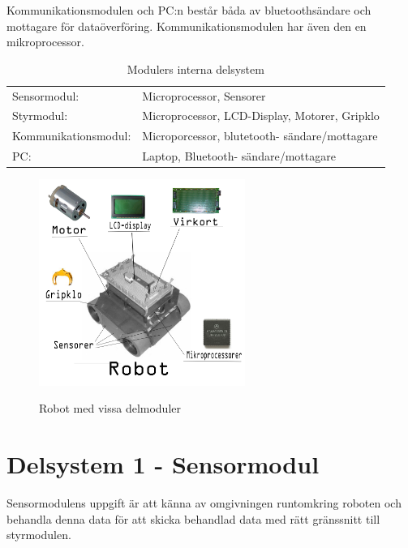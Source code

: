 \documentclass[11pt]{article}
\begin{document}
\begin{flushleft}
\bigskip

Kommunikationsmodulen och PC:n består båda av bluetoothsändare och mottagare för dataöverföring. Kommunikationsmodulen har även den en mikroprocessor.

\bigskip

\begin{table}[ht]

\centering
\begin{tabular}{l l}
Sensormodul:&
Microprocessor, Sensorer \\

Styrmodul:&
Microprocessor, LCD-Display, Motorer, Gripklo\\

Kommunikationsmodul:&
Microporcessor, blutetooth- sändare/mottagare  \\

PC:&
Laptop, Bluetooth- sändare/mottagare \\
\end{tabular}
\caption{Modulers interna delsystem}
\label{tab:Delmoduler}
\end{table}

\begin{figure}[H]
\centering
\caption{Robot med vissa delmoduler}
\includegraphics[width=0.6\textwidth]{Robot_moduler}
\label{figure:robot}
\end{figure}


\section{Delsystem 1 - Sensormodul}
Sensormodulens uppgift är att känna av omgivningen runtomkring roboten och behandla denna data för att skicka behandlad data med rätt gränssnitt till styrmodulen.



\end{flushleft}
\end{document}
